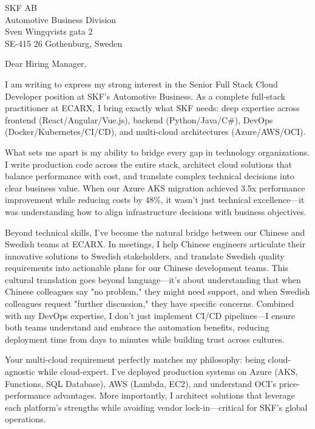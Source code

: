 \documentclass[a4paper,10pt]{article}
\begin{document}
\pagestyle{empty} %

\begin{letter}{\color{darkblue}
SKF AB\\
Automotive Business Division\\
Sven Wingqvists gata 2\\
SE-415 26 Gothenburg, Sweden}

\vspace{30pt}

\opening{Dear Hiring Manager,}

\vspace{8pt}

I am writing to express my strong interest in the Senior Full Stack Cloud Developer position at SKF's Automotive Business. As a complete full-stack practitioner at ECARX, I bring exactly what SKF needs: deep expertise across frontend (React/Angular/Vue.js), backend (Python/Java/C\#), DevOps (Docker/Kubernetes/CI/CD), and multi-cloud architectures (Azure/AWS/OCI).

What sets me apart is my ability to bridge every gap in technology organizations. I write production code across the entire stack, architect cloud solutions that balance performance with cost, and translate complex technical decisions into clear business value. When our Azure AKS migration achieved 3.5x performance improvement while reducing costs by 48\%, it wasn't just technical excellence—it was understanding how to align infrastructure decisions with business objectives.

Beyond technical skills, I've become the natural bridge between our Chinese and Swedish teams at ECARX. In meetings, I help Chinese engineers articulate their innovative solutions to Swedish stakeholders, and translate Swedish quality requirements into actionable plans for our Chinese development teams. This cultural translation goes beyond language—it's about understanding that when Chinese colleagues say "no problem," they might need support, and when Swedish colleagues request "further discussion," they have specific concerns. Combined with my DevOps expertise, I don't just implement CI/CD pipelines—I ensure both teams understand and embrace the automation benefits, reducing deployment time from days to minutes while building trust across cultures.

Your multi-cloud requirement perfectly matches my philosophy: being cloud-agnostic while cloud-expert. I've deployed production systems on Azure (AKS, Functions, SQL Database), AWS (Lambda, EC2), and understand OCI's price-performance advantages. More importantly, I architect solutions that leverage each platform's strengths while avoiding vendor lock-in—critical for SKF's global operations.


\end{letter}
\end{document}
